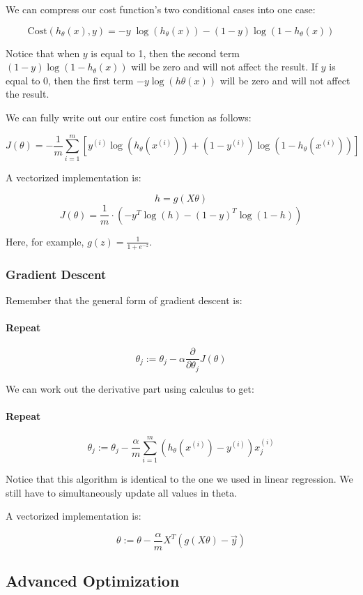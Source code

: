 \documentclass[UTF8]{article}
\begin{document}
We can compress our cost function's two conditional cases into one case:

\[ \mathrm{Cost}(h_\theta(x),y) = - y \; \log(h_\theta(x)) - (1 - y) \log(1 - h_\theta(x)) \]

Notice that when $y$ is equal to 1, then the second term $(1-y)\log(1-h_\theta(x))$ will be zero and will not affect the result. If $y$ is equal to 0, then the first term $-y\log(h\theta(x))$ will be zero and will not affect the result.

We can fully write out our entire cost function as follows:

\[J(\theta) = - \frac{1}{m} \displaystyle \sum_{i=1}^m [y^{(i)}\log (h_\theta (x^{(i)})) + (1 - y^{(i)})\log (1 - h_\theta(x^{(i)}))]\]

A vectorized implementation is:

\[ h = g(X\theta) \]
\[ J(\theta) = \frac{1}{m} \cdot \left(-y^{T}\log(h)-(1-y)^{T}\log(1-h)\right) \]

Here, for example, $g(z) = \frac{1}{1 + e^{-z}}$.

\subsubsection{Gradient Descent}

Remember that the general form of gradient descent is:

\paragraph{Repeat}
\[ \theta_j := \theta_j - \alpha \dfrac{\partial}{\partial \theta_j}J(\theta) \]

We can work out the derivative part using calculus to get:

\paragraph{Repeat}
\[ \theta_j := \theta_j - \frac{\alpha}{m} \sum_{i=1}^m (h_\theta(x^{(i)}) - y^{(i)}) x_j^{(i)} \]

Notice that this algorithm is identical to the one we used in linear regression. We still have to simultaneously update all values in theta.

A vectorized implementation is:

\[ \theta := \theta - \frac{\alpha}{m} X^{T} (g(X \theta ) - \vec{y}) \]

\subsection{Advanced Optimization}
\end{document}
